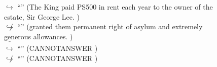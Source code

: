 \documentclass[11pt,a4paper, onecolumn]{article}
\begin{document}
\begin{figure}[t] \small \begin{tcolorbox}[boxsep=0pt,left=5pt,right=0pt,top=2pt,colback = yellow!5] \begin{dialogue}
 \small 
\colorbox{pink!25}{$\hookrightarrow$}
{ ``'' (The King paid PS500 in rent each year to the owner of the estate, Sir George Lee. ) }
\\
\colorbox{pink!25}{$\not\hookrightarrow$}
{ ``'' (granted them permanent right of asylum and extremely generous allowances. ) }
\\
\colorbox{pink!25}{ $\bar{\hookrightarrow}$}
{ ``'' (CANNOTANSWER ) }
\\
\colorbox{pink!25}{$\not\hookrightarrow$}
{ ``'' (CANNOTANSWER ) }
\\
 \end{dialogue}\end{tcolorbox}\end{figure}
\end{document}
